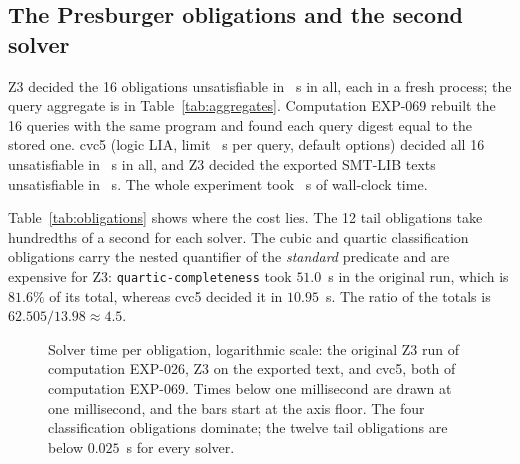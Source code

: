 \documentclass[11pt]{article}
\theoremstyle{definition}
\theoremstyle{remark}
\begin{document}
\subsection{The Presburger obligations and the second solver}

Z3 \SolverZthree{} \cite{DeMouraBjorner2008} decided the 16 obligations unsatisfiable in \ExpTwentySixCertificateSeconds{}~s in
all, each in a fresh process; the query aggregate is in Table~\ref{tab:aggregates}.
Computation EXP-069 rebuilt the 16 queries with the same program and found each query digest
equal to the stored one. cvc5 \SolverCvc{} \cite{Barbosa2022} (logic LIA, limit \SolverLimit{}~s per query, default
options) decided all 16 unsatisfiable in \CvcTotalSeconds{}~s in all, and Z3 decided the exported
SMT-LIB texts unsatisfiable in \ZthreeRoundTripSeconds{}~s. The whole experiment took
\SolverWallSeconds{}~s of wall-clock time.

\begin{table}[ht]
\centering
\small
\resizebox{\textwidth}{!}{}
\caption{The 16 Presburger obligations of Appendix~\ref{app:obligations}: the original Z3 time
of computation EXP-026, the Z3 time on the exported text and the cvc5 time of computation EXP-069,
and the first twelve hex digits of the query digest. Every entry is unsatisfiable for each solver,
and every query digest equals the stored one. The totals are the elapsed times recorded in the
artifacts.}
\label{tab:obligations}
\end{table}

Table~\ref{tab:obligations} shows where the cost lies. The 12 tail obligations take hundredths of
a second for each solver. The cubic and quartic classification obligations carry the nested
quantifier of the \emph{standard} predicate and are expensive for Z3: \texttt{quartic-completeness}
took $51.0$~s in the original run, which is $81.6\%$ of its total, whereas cvc5 decided it in $10.95$~s.
The ratio of the totals is $62.505/13.98\approx4.5$.

\begin{figure}[ht]
\centering

\caption{Solver time per obligation, logarithmic scale: the original Z3 run of computation EXP-026,
Z3 on the exported text, and cvc5, both of computation EXP-069. Times below one millisecond are drawn
at one millisecond, and the bars start at the axis floor. The four classification obligations
dominate; the twelve tail obligations are below $0.025$~s for every solver.}
\label{fig:times}
\end{figure}
\end{document}
